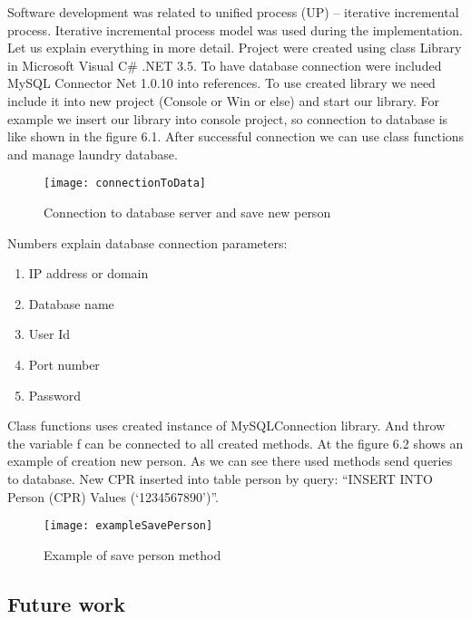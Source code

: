 Software development was related to unified process (UP) – iterative incremental process.  Iterative incremental process model \cite{bib5} was used during the implementation.  
Let us explain everything in more detail. Project were created using class Library in Microsoft Visual C\# .NET 3.5. To have database connection were included MySQL Connector Net 1.0.10 into references. To use created library we need include it into new project (Console or Win or else) and start our library. For example we insert our library into console project, so connection to database is like shown in the figure 6.1. After successful connection we can use class functions and manage laundry database. 

\begin{figure}[h]
	\centering
		\texttt{[image: connectionToData]}
	\caption{Connection to database server and save new person}
	\label{fig:planning}
\end{figure}

Numbers explain database connection parameters:

\begin{enumerate}
	\item IP address or domain
	\item Database name
	\item User Id
	\item Port number
	\item Password
\end{enumerate}

Class functions uses created instance of MySQLConnection library. And throw the variable f can be connected to all created methods. At the figure 6.2 shows an example of creation new person. As we can see there used methods send queries to database. New CPR inserted into table person by query: “INSERT INTO Person (CPR) Values (‘1234567890’)”.

\begin{figure}[h]
	\centering
		\texttt{[image: exampleSavePerson]}
	\caption{Example of save person method}
	\label{fig:planning}
\end{figure}

\subsection{Future work}